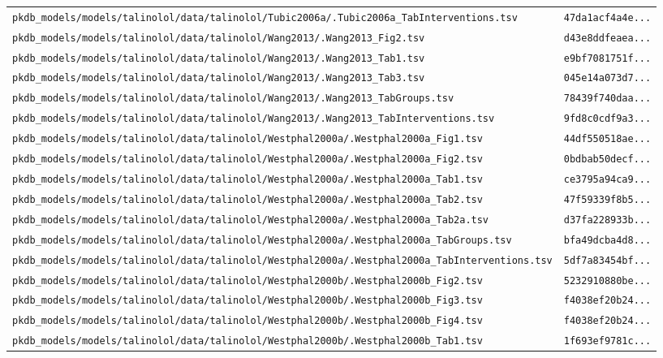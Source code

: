 \documentclass{article}
\begin{document}
\begin{longtable}{ll}
\texttt{pkdb\_models/models/talinolol/data/talinolol/Tubic2006a/.Tubic2006a\_TabInterventions.tsv} & \texttt{47da1acf4a4e...} \\
\texttt{pkdb\_models/models/talinolol/data/talinolol/Wang2013/.Wang2013\_Fig2.tsv} & \texttt{d43e8ddfeaea...} \\
\texttt{pkdb\_models/models/talinolol/data/talinolol/Wang2013/.Wang2013\_Tab1.tsv} & \texttt{e9bf7081751f...} \\
\texttt{pkdb\_models/models/talinolol/data/talinolol/Wang2013/.Wang2013\_Tab3.tsv} & \texttt{045e14a073d7...} \\
\texttt{pkdb\_models/models/talinolol/data/talinolol/Wang2013/.Wang2013\_TabGroups.tsv} & \texttt{78439f740daa...} \\
\texttt{pkdb\_models/models/talinolol/data/talinolol/Wang2013/.Wang2013\_TabInterventions.tsv} & \texttt{9fd8c0cdf9a3...} \\
\texttt{pkdb\_models/models/talinolol/data/talinolol/Westphal2000a/.Westphal2000a\_Fig1.tsv} & \texttt{44df550518ae...} \\
\texttt{pkdb\_models/models/talinolol/data/talinolol/Westphal2000a/.Westphal2000a\_Fig2.tsv} & \texttt{0bdbab50decf...} \\
\texttt{pkdb\_models/models/talinolol/data/talinolol/Westphal2000a/.Westphal2000a\_Tab1.tsv} & \texttt{ce3795a94ca9...} \\
\texttt{pkdb\_models/models/talinolol/data/talinolol/Westphal2000a/.Westphal2000a\_Tab2.tsv} & \texttt{47f59339f8b5...} \\
\texttt{pkdb\_models/models/talinolol/data/talinolol/Westphal2000a/.Westphal2000a\_Tab2a.tsv} & \texttt{d37fa228933b...} \\
\texttt{pkdb\_models/models/talinolol/data/talinolol/Westphal2000a/.Westphal2000a\_TabGroups.tsv} & \texttt{bfa49dcba4d8...} \\
\texttt{pkdb\_models/models/talinolol/data/talinolol/Westphal2000a/.Westphal2000a\_TabInterventions.tsv} & \texttt{5df7a83454bf...} \\
\texttt{pkdb\_models/models/talinolol/data/talinolol/Westphal2000b/.Westphal2000b\_Fig2.tsv} & \texttt{5232910880be...} \\
\texttt{pkdb\_models/models/talinolol/data/talinolol/Westphal2000b/.Westphal2000b\_Fig3.tsv} & \texttt{f4038ef20b24...} \\
\texttt{pkdb\_models/models/talinolol/data/talinolol/Westphal2000b/.Westphal2000b\_Fig4.tsv} & \texttt{f4038ef20b24...} \\
\texttt{pkdb\_models/models/talinolol/data/talinolol/Westphal2000b/.Westphal2000b\_Tab1.tsv} & \texttt{1f693ef9781c...} \\

\end{longtable}
\end{document}

